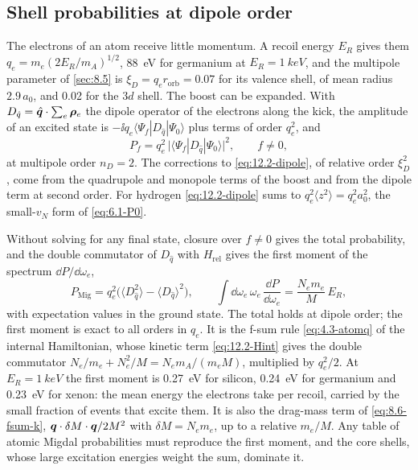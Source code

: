 \subsection{Shell probabilities at dipole order}\label{sec:12.2-dipole}

The electrons of an atom receive little momentum. A recoil energy $E_R$ gives them $q_e = m_e(2E_R/m_A)^{1/2}$, \SI{88}{eV} for germanium at $E_R = \SI{1}{keV}$, and the multipole parameter of \cref{sec:8.5} is $\xi_D = q_er_{\mathrm{orb}} = 0.07$ for its valence shell, of mean radius $2.9\,a_0$, and 0.02 for the $3d$ shell. The boost can be expanded. With $D_{\hat q} = \hat{\bm{q}}\cdot\sum_e\bm{\rho}_e$ the dipole operator of the electrons along the kick, the amplitude of an excited state is $-\ii q_e\langle\Psi_f|D_{\hat q}|\Psi_0\rangle$ plus terms of order $q_e^2$, and
\begin{equation}
  P_f = q_e^2\,\bigl|\langle\Psi_f|D_{\hat q}|\Psi_0\rangle\bigr|^2 , \qquad f \neq 0 ,
  \label{eq:12.2-dipole}
\end{equation}
at multipole order $n_D = 2$. The corrections to \cref{eq:12.2-dipole}, of relative order $\xi_D^2$, come from the quadrupole and monopole terms of the boost and from the dipole term at second order. For hydrogen \cref{eq:12.2-dipole} sums to $q_e^2\langle z^2\rangle = q_e^2a_0^2$, the small-$v_N$ form of \cref{eq:6.1-P0}.

Without solving for any final state, closure over $f \neq 0$ gives the total probability, and the double commutator of $D_{\hat q}$ with $H_{\mathrm{rel}}$ gives the first moment of the spectrum $\dd P/\dd\omega_e$,
\begin{equation}
  P_{\mathrm{Mig}} = q_e^2\bigl(\langle D_{\hat q}^2\rangle - \langle D_{\hat q}\rangle^2\bigr) , \qquad
  \int\dd\omega_e\,\omega_e\,\frac{\dd P}{\dd\omega_e} = \frac{N_em_e}{M}\,E_R ,
  \label{eq:12.2-sums}
\end{equation}
with expectation values in the ground state. The total holds at dipole order; the first moment is exact to all orders in $q_e$. It is the f-sum rule \cref{eq:4.3-atomq} of the internal Hamiltonian, whose kinetic term \cref{eq:12.2-Hint} gives the double commutator $N_e/m_e + N_e^2/M = N_em_A/(m_eM)$, multiplied by $q_e^2/2$. At $E_R = \SI{1}{keV}$ the first moment is \SI{0.27}{eV} for silicon, \SI{0.24}{eV} for germanium and \SI{0.23}{eV} for xenon: the mean energy the electrons take per recoil, carried by the small fraction of events that excite them. It is also the drag-mass term of \cref{eq:8.6-fsum-k}, $\bm{q}\cdot\delta M\cdot\bm{q}/2M^2$ with $\delta M = N_em_e$, up to a relative $m_e/M$. Any table of atomic Migdal probabilities must reproduce the first moment, and the core shells, whose large excitation energies weight the sum, dominate it.

